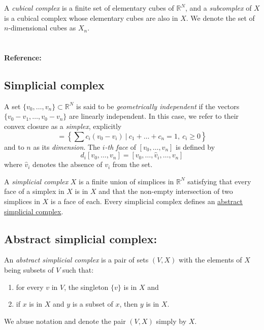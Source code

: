 \documentclass{amsart}
\begin{document}
	A \textit{cubical complex} is a finite set of elementary cubes of $\mathbb{R}^N$, and a \textit{subcomplex} of $X$ is a cubical complex whose elementary cubes are also in $X$. We denote the set of $n$-dimensional cubes as $X_n$.
	
	\paragraph{\\ Reference:} \cite{mischaikow04computational}
	
	\subsection*{Simplicial complex} \label{simplicial complex}
	
	A set $\{v_0, \dots, v_n\} \subset \mathbb{R}^N$ is said to be \textit{geometrically independent} if the vectors $\{v_0-v_1, \dots, v_0-v_n\}$ are linearly independent. In this case, we refer to their convex closure as a \textit{simplex}, explicitly
	\begin{equation*}
	[v_0,\dots,v_n] = \left\{ \sum c_i (v_0 - v_i)\ \big|\ c_1+\dots+c_n = 1,\ c_i \geq 0 \right\}
	\end{equation*}
	and to $n$ as its \textit{dimension}. The \textit{$i$-th face} of $[v_0, \dots, v_n]$ is defined by
	\begin{equation*}
	d_i[v_0, \dots, v_n] = [v_0, \dots, \widehat{v}_i, \dots, v_n]
	\end{equation*}
	where $\widehat{v}_i$ denotes the absence of $v_i$ from the set.
	
	A \textit{simplicial complex} $X$ is a finite union of simplices in $\mathbb{R}^N$ satisfying that every face of a simplex in $X$ is in $X$ and that the non-empty intersection of two simplices in $X$ is a face of each. Every simplicial complex defines an \hyperref[abstract simplicial complex]{abstract simplicial complex}.
	
	\subsection*{Abstract simplicial complex:} \label{abstract simplicial complex}
	
	An \textit{abstract simplicial complex} is a pair of sets $(V, X)$ with the elements of $X$ being subsets of $V$ such that: 
	\begin{enumerate}
		\item for every $v$ in $V$, the singleton $\{v\}$ is in $X$ and
		\item if $x$ is in $X$ and $y$ is a subset of $x$, then $y$ is in $X$. 
	\end{enumerate}
	We abuse notation and denote the pair $(V, X)$ simply by $X$.
	
\end{document}
